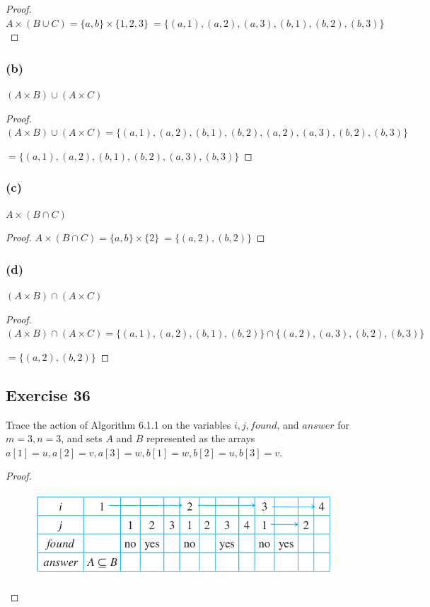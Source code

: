 \documentclass[14pt]{extarticle}
\begin{document}
\begin{proof}
\(A \times (B \cup C) = \{a, b\} \times \{1, 2, 3\}\ = \{(a, 1), (a, 2), (a, 3), (b, 1), (b, 2), (b, 3)\}\)
\end{proof}

\subsubsection{(b)}
$(A \times B) \cup (A \times C)$

\begin{proof}
\((A \times B) \cup (A \times C) = \{(a, 1), (a, 2), (b, 1), (b, 2), (a, 2), (a, 3), (b, 2), (b, 3)\}\) 

\(= \{(a, 1), (a, 2), (b, 1), (b, 2), (a, 3), (b, 3)\}\)
\end{proof}

\subsubsection{(c)}
$A \times (B \cap C)$

\begin{proof}
\(A \times (B \cap C) = \{a, b\} \times \{2\}\ = \{(a, 2), (b, 2)\}\)
\end{proof}

\subsubsection{(d)}
$(A \times B) \cap (A \times C)$

\begin{proof}
\((A \times B) \cap (A \times C) = \{(a, 1), (a, 2), (b, 1), (b, 2)\} \cap \{(a, 2), (a, 3), (b, 2), (b, 3)\}\) 

\(= \{(a, 2), (b, 2)\}\)
\end{proof}

\subsection{Exercise 36}
Trace the action of Algorithm 6.1.1 on the variables $i, j, found$, and $answer$ for $m = 3, n = 3$, and sets $A$ and 
$B$ represented as the arrays \(a[1] = u, a[2] = v, a[3] = w, b[1] = w, b[2] = u, b[3] = v\).

\begin{proof}
\begin{figure}[ht!]
\centering
\includegraphics[scale=0.5]{../images/6.1.36.png}
\end{figure}
\end{proof}
\end{document}
